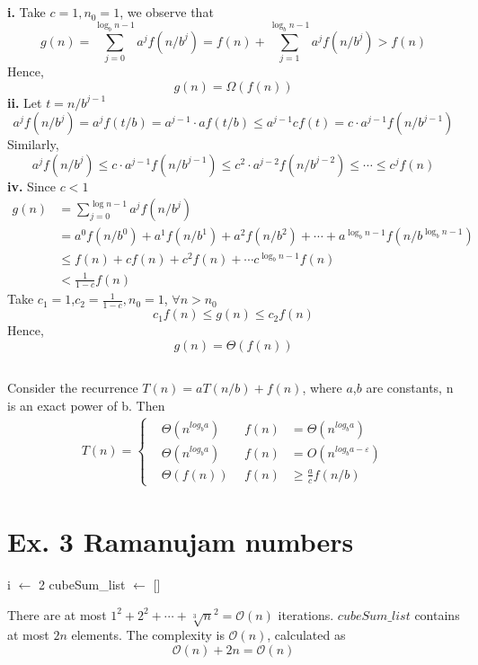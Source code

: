 \documentclass[12pt,a4paper]{article}
\theoremstyle{definition}
\begin{document}
\subsection{}
\textbf{i.} Take $c=1,n_0=1$, we observe that
$$
g(n)=\sum_{j=0}^{\log _{b} n-1} a^{j} f\left(n / b^{j}\right)=f(n)+\sum_{j=1}^{\log _{b} n-1} a^{j} f\left(n / b^{j}\right)>f(n)
$$
Hence, 
$$
  g(n)=\Omega(f(n))
$$
\textbf{ii.} Let $t=n/b^{j-1}$
$$
a^{j} f\left(n / b^{j}\right)=a^{j} f(t / b)=a^{j-1}\cdot af(t / b) \leq a^{j-1} c f(t)=c \cdot a^{j-1} f(n/b^{j-1})
$$
Similarly,
$$
a^{j} f\left(n / b^{j}\right) \leq c \cdot a^{j-1} f(n/b^{j-1}) \leq c^2 \cdot a^{j-2} f(n/b^{j-2}) \leq \cdots \leq c^jf(n)
$$
\textbf{iv.} Since $c<1$
\begin{align*}
  g(n)&=\sum_{j=0}^{\log n-1} a^{j} f\left(n / b^{j}\right) \\
  &= a^{0} f\left(n / b^{0}\right)+a^1 f(n / b^1)+a^{2} f\left(n / b^{2}\right)+\cdots+a^{\log _{b} n-1} f\left(n / b^{\log _{b} n-1}\right)\\
  &\leq f(n)+cf(n)+c^2f(n)+ \cdots c^{\log_bn-1}f(n) \\
  & < \frac{1}{1-c}f(n)
\end{align*}
Take $c_1=1$,$c_2=\frac{1}{1-c},n_0=1$, $\forall n > n_0$
$$
  c_1 f(n) \leq g(n) \leq c_2f(n)
$$
Hence,
$$
  g(n)=\Theta(f(n))
$$
\subsection{}
Consider the recurrence $T(n)=a T(n / b)+f(n)$, where $a$,$b$ are constants, n is an exact power of b. Then
\begin{align*}
	T(n) = \left\{
	\begin{aligned}
	&\Theta(n^{log_ba}) \ \ & f(n) &= \Theta(n^{log_ba})\\
	& \Theta(n^{log_ba})\ \ \  & f(n) &= O(n^{log_ba- \varepsilon}) \\
	& \Theta(f(n))\ \  & f(n) &\geq  \frac{a}{c}f(n/b)
	\end{aligned}
	\right.
\end{align*}
\section{Ex. 3 Ramanujam numbers}
\begin{algorithm}[H]
  i $\gets$ 2\;
  cubeSum\_list $\gets$ [] \;
  
\end{algorithm}	
There are at most $1^2+2^2+\cdots+\sqrt[3]{n}^2=\mathcal{O}(n)$ iterations. $cubeSum\_list$ contains at most $2n$ elements. The complexity is $\mathcal{O}(n)$, calculated as
$$
  \mathcal{O}(n)+2n = \mathcal{O}(n)
$$
\end{document}
